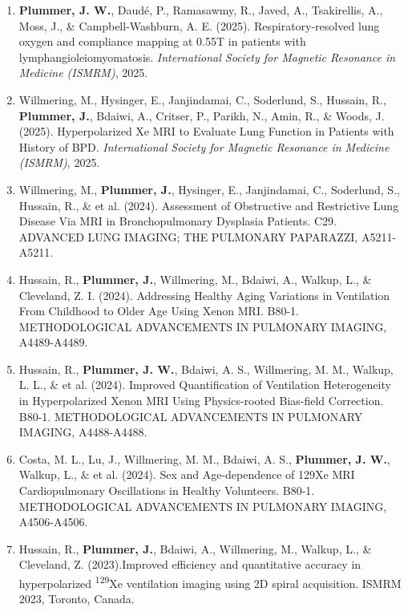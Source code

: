 \documentclass[12pt,]{scrartcl}
\begin{document}
\begin{enumerate}
    \item \textbf{Plummer, J. W.}, Daudé, P., Ramasawmy, R., Javed, A., Tsakirellis, A., Moss, J., \& Campbell-Washburn, A. E. (2025). Respiratory-resolved lung oxygen and compliance mapping at 0.55T in patients with lymphangioleiomyomatosis. \textit{International Society for Magnetic Resonance in Medicine (ISMRM)}, 2025.

    \item Willmering, M., Hysinger, E., Janjindamai, C., Soderlund, S., Hussain, R., \textbf{Plummer, J.}, Bdaiwi, A., Critser, P., Parikh, N., Amin, R., \& Woods, J. (2025). Hyperpolarized Xe MRI to Evaluate Lung Function in Patients with History of BPD. \textit{International Society for Magnetic Resonance in Medicine (ISMRM)}, 2025.

    


    \item Willmering, M., \textbf{Plummer, J.}, Hysinger, E., Janjindamai, C., Soderlund, S., Hussain, R., \& et al. (2024). Assessment of Obstructive and Restrictive Lung Disease Via MRI in Bronchopulmonary Dysplasia Patients. C29. ADVANCED LUNG IMAGING; THE PULMONARY PAPARAZZI, A5211-A5211.

    \item Hussain, R., \textbf{Plummer, J.}, Willmering, M., Bdaiwi, A., Walkup, L., \& Cleveland, Z. I. (2024). Addressing Healthy Aging Variations in Ventilation From Childhood to Older Age Using Xenon MRI. B80-1. METHODOLOGICAL ADVANCEMENTS IN PULMONARY IMAGING, A4489-A4489.

    \item Hussain, R., \textbf{Plummer, J. W.}, Bdaiwi, A. S., Willmering, M. M., Walkup, L. L., \& et al. (2024). Improved Quantification of Ventilation Heterogeneity in Hyperpolarized Xenon MRI Using Physics-rooted Bias-field Correction. B80-1. METHODOLOGICAL ADVANCEMENTS IN PULMONARY IMAGING, A4488-A4488.

    \item Costa, M. L., Lu, J., Willmering, M. M., Bdaiwi, A. S., \textbf{Plummer, J. W.}, Walkup, L., \& et al. (2024). Sex and Age-dependence of 129Xe MRI Cardiopulmonary Oscillations in Healthy Volunteers. B80-1. METHODOLOGICAL ADVANCEMENTS IN PULMONARY IMAGING, A4506-A4506.

    \item Hussain, R., \textbf{Plummer, J.}, Bdaiwi, A., Willmering, M., Walkup, L., \& Cleveland, Z. (2023).Improved efficiency and quantitative accuracy in hyperpolarized \textsuperscript{129}Xe ventilation imaging using 2D spiral acquisition. ISMRM 2023, Toronto, Canada.
    

\end{enumerate}
\end{document}
